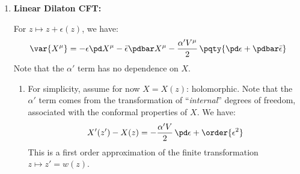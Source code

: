 \documentclass[a4paper,10pt]{article}
\begin{document}
\begin{enumerate}
\begin{enumerate}
	\end{enumerate}
	
	\item \textbf{Linear Dilaton CFT:}
	
	For $z\mapsto z + \epsilon(z)$, we have:
	\begin{equation}
		\var{X^\mu}
		= - \epsilon\pd X^\mu
			- \bar{\epsilon}\pdbar X^\mu
			- \frac{\alpha'V^\mu}{2}\,\pqty{
				\pd\epsilon
				+ \pdbar\bar{\epsilon}
			}
	\end{equation}
	Note that the $\alpha'$ term has no dependence on $X$. 
	
	\begin{enumerate}
	\item For simplicity, assume for now $X = X(z)$: holomorphic. Note that the $\alpha'$ term comes from the transformation of ``\textit{internal}'' degrees of freedom, associated with the conformal properties of $X$. We have:
	\begin{gather}
		X'(z') - X(z)
		= -\frac{\alpha' V}{2}\,\pd\epsilon
			+ \order{\epsilon^2}
		\label{eq:dilaton_holomorphic}
	\end{gather}
	This is a first order approximation of the finite transformation $z\mapsto z' = w(z)$. 
	

\end{enumerate}
\end{enumerate}
\end{document}
